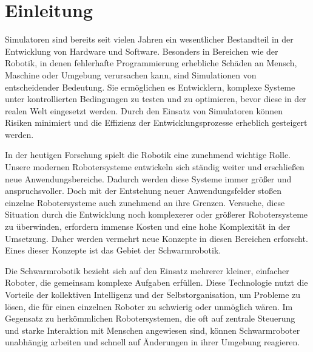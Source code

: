 \documentclass[german,version-2020-11]{uzl-thesis}
\begin{document}
%
%


\chapter{Einleitung}

Simulatoren sind bereits seit vielen Jahren ein wesentlicher Bestandteil in der Entwicklung von Hardware und Software. 
Besonders in Bereichen wie der Robotik, in denen fehlerhafte Programmierung erhebliche Schäden an Mensch, 
Maschine oder Umgebung verursachen kann, sind Simulationen von entscheidender Bedeutung. 
Sie ermöglichen es Entwicklern, komplexe Systeme unter kontrollierten Bedingungen zu testen und zu optimieren, bevor diese in der realen Welt eingesetzt werden. 
Durch den Einsatz von Simulatoren können Risiken minimiert und die Effizienz der Entwicklungsprozesse erheblich gesteigert werden.




In der heutigen Forschung spielt die Robotik eine zunehmend wichtige Rolle. 
Unsere modernen Robotersysteme entwickeln sich ständig weiter und erschließen neue Anwendungsbereiche. 
Dadurch werden diese Systeme immer größer und anspruchsvoller. 
Doch mit der Entstehung neuer Anwendungsfelder stoßen einzelne Robotersysteme auch zunehmend an ihre Grenzen. 
Versuche, diese Situation durch die Entwicklung noch komplexerer oder größerer Robotersysteme zu überwinden, erfordern immense Kosten und eine hohe Komplexität in der Umsetzung. 
Daher werden vermehrt neue Konzepte in diesen Bereichen erforscht. Eines dieser Konzepte ist das Gebiet der Schwarmrobotik.

Die Schwarmrobotik bezieht sich auf den Einsatz mehrerer kleiner, einfacher Roboter, die gemeinsam komplexe Aufgaben erfüllen. 
Diese Technologie nutzt die Vorteile der kollektiven Intelligenz und der Selbstorganisation, um Probleme zu lösen, die für einen einzelnen Roboter zu schwierig oder unmöglich wären. 
Im Gegensatz zu herkömmlichen Robotersystemen, die oft auf zentrale Steuerung und starke Interaktion mit Menschen angewiesen sind, 
können Schwarmroboter unabhängig arbeiten und schnell auf Änderungen in ihrer Umgebung reagieren.
\end{document}
